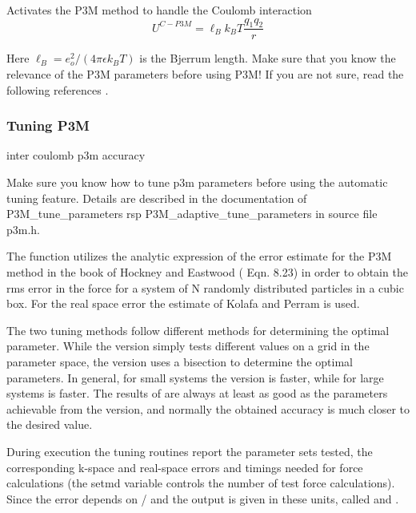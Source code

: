 Activates the P3M method to handle the Coulomb
interaction
\begin{equation}
  U^{C-P3M} = \ell_B k_B T \frac{q_1 q_2}{r}
\end{equation}

Here $\ell_B = e_o^2 / (4 \pi \epsilon k_B T)$ is the Bjerrum length.
Make sure that you know the relevance of the P3M parameters before
using P3M! If you are not sure, read the following references \cite{ewald21,hockney88,kolafa92,deserno98,deserno98a,deserno00,deserno00a}.

\subsubsection{Tuning P3M}
\begin{essyntax}
  inter coulomb p3m 
  accuracy \\
\end{essyntax}


Make sure you know how to tune p3m parameters before using the
automatic tuning feature. Details are described in the documentation
of P3M_tune_parameters rsp P3M_adaptive_tune_parameters in source file p3m.h.

The function utilizes the analytic expression of the error estimate for the P3M method in the book of Hockney and Eastwood (\cite{hockney88} Eqn. 8.23) in order to obtain the rms error in the force for a system of N randomly distributed particles in a cubic box. For the real space error the estimate of Kolafa and Perram\cite{kolafa92} is used.

The two tuning methods follow different methods for determining the
optimal parameter. While the  version simply tests
different values on a grid in the parameter space, the
 version uses a bisection to determine the optimal
parameters. In general, for small systems the  version
is faster, while for large systems  is faster. The
results of  are always at least as good as the
parameters achievable from the  version, and normally
the obtained accuracy is much closer to the desired value.

During execution the tuning routines report the parameter sets tested, the corresponding k-space and real-space errors and timings needed for force calculations (the setmd variable  controls the number of test force calculations). Since the error depends on / and  the output is given in these units, called  and .

